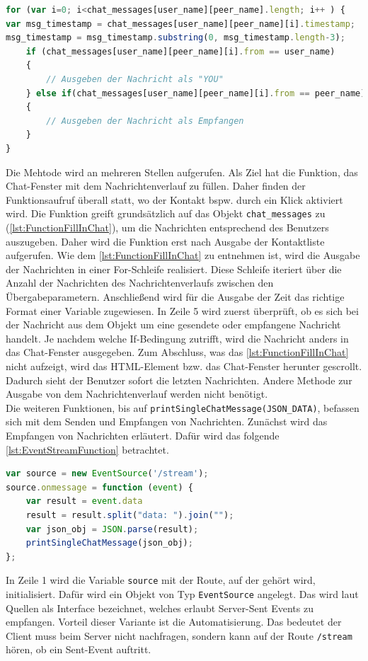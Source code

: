 \documentclass[a4paper,titlepage,halfparskip,12pt]{scrreprt}
\begin{document}
\begin{onehalfspacing}
\begin{lstlisting}[language=Javascript,caption=Ausschnitt aus der Funktion \texttt{pull\_chat\_hisotry(username)} ,label={lst:FunctionFillInChat}]
for (var i=0; i<chat_messages[user_name][peer_name].length; i++ ) {
var msg_timestamp = chat_messages[user_name][peer_name][i].timestamp;
msg_timestamp = msg_timestamp.substring(0, msg_timestamp.length-3);
	if (chat_messages[user_name][peer_name][i].from == user_name)
	{
		// Ausgeben der Nachricht als "YOU"	
	} else if(chat_messages[user_name][peer_name][i].from == peer_name)
	{	
		// Ausgeben der Nachricht als Empfangen
	}
}
\end{lstlisting}
Die Mehtode wird an mehreren Stellen aufgerufen. Als Ziel hat die Funktion, das Chat-Fenster mit dem Nachrichtenverlauf zu füllen. Daher finden der Funktionsaufruf überall statt, wo der Kontakt bspw. durch ein Klick aktiviert wird. Die Funktion greift grundsätzlich auf das Objekt \texttt{chat\_messages} zu (\autoref{lst:FunctionFillInChat}), um die Nachrichten entsprechend des Benutzers auszugeben. Daher wird die Funktion erst nach Ausgabe der Kontaktliste aufgerufen. Wie dem \autoref{lst:FunctionFillInChat} zu entnehmen ist, wird die Ausgabe der Nachrichten in einer For-Schleife realisiert. Diese Schleife iteriert über die Anzahl der Nachrichten des Nachrichtenverlaufs zwischen den Übergabeparametern. Anschließend wird für die Ausgabe der Zeit das richtige Format einer Variable zugewiesen. In Zeile 5 wird zuerst überprüft, ob es sich bei der Nachricht aus dem Objekt um eine gesendete oder empfangene Nachricht handelt. Je nachdem welche If-Bedingung zutrifft, wird die Nachricht anders in das Chat-Fenster ausgegeben. Zum Abschluss, was das \autoref{lst:FunctionFillInChat} nicht aufzeigt, wird das \ac{HTML}-Element bzw. das Chat-Fenster herunter gescrollt. Dadurch sieht der Benutzer sofort die letzten Nachrichten. Andere Methode zur Ausgabe von dem Nachrichtenverlauf werden nicht benötigt.\\
Die weiteren Funktionen, bis auf \texttt{printSingleChatMessage(JSON\_DATA)}, befassen sich mit dem Senden und Empfangen von Nachrichten. Zunächst wird das Empfangen von Nachrichten erläutert. Dafür wird das folgende \autoref{lst:EventStreamFunction} betrachtet.
\begin{lstlisting}[language=Javascript,caption=Öffnen des Eventstreams um Nachrichten zu empfangen ,label={lst:EventStreamFunction}]
var source = new EventSource('/stream');
source.onmessage = function (event) {
	var result = event.data
	result = result.split("data: ").join("");
	var json_obj = JSON.parse(result);
	printSingleChatMessage(json_obj);
};
\end{lstlisting}
In Zeile 1 wird die Variable \texttt{source} mit der Route, auf der gehört wird, initialisiert. Dafür wird ein Objekt von Typ \texttt{EventSource} angelegt. Das wird laut Quellen als Interface bezeichnet, welches erlaubt Server-Sent Events zu empfangen. Vorteil dieser Variante ist die Automatisierung. Das bedeutet der Client muss beim Server nicht nachfragen, sondern kann auf der Route \texttt{/stream} hören, ob ein Sent-Event auftritt.\cite{w3schoolsServerSentEvent}\\

\end{onehalfspacing}
\end{document}
